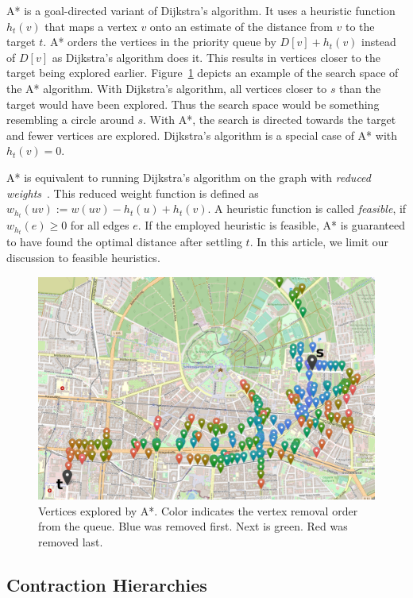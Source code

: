 \documentclass[manuscript,review]{acmart}
\begin{document}
A* is a goal-directed variant of Dijkstra's algorithm.
It uses a heuristic function $h_t(v)$ that maps a vertex $v$ onto an estimate of the distance from $v$ to the target $t$.
A* orders the vertices in the priority queue by $D[v] + h_t(v)$ instead of $D[v]$ as Dijkstra's algorithm does it.
This results in vertices closer to the target being explored earlier.
Figure~\ref{img:search-space} depicts an example of the search space of the A* algorithm.
With Dijkstra's algorithm, all vertices closer to $s$ than the target would have been explored.
Thus the search space would be something resembling a circle around $s$.
With A*, the search is directed towards the target and fewer vertices are explored.
Dijkstra's algorithm is a special case of A* with $h_t(v)=0$.

A* is equivalent to running Dijkstra's algorithm on the graph with \emph{reduced weights}~\cite{hnr-afbhd-68}.
This reduced weight function is defined as $w_{h_t}(uv) := w(uv) - h_t(u) + h_t(v)$.
A heuristic function is called \emph{feasible}, if $w_{h_t}(e) \geq 0$ for all edges $e$.
If the employed heuristic is feasible, A* is guaranteed to have found the optimal distance after settling $t$.
In this article, we limit our discussion to feasible heuristics.

\begin{figure}
\centering
\includegraphics[width=.6\columnwidth]{fig/searchspace_st.png}
\caption{Vertices explored by A*. Color indicates the vertex removal order from the queue. Blue was removed first. Next is green. Red was removed last.}
\label{img:search-space}
\end{figure}

\subsection{Contraction Hierarchies}
\end{document}
